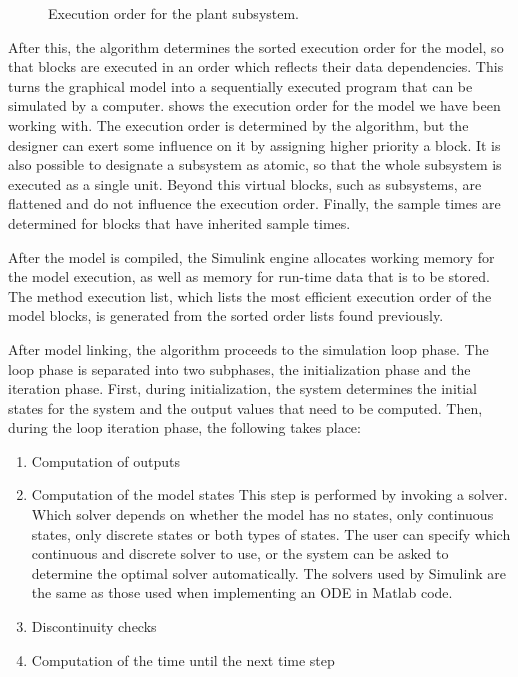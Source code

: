 \documentclass[\rootfolder/main.tex]{subfiles}
\begin{document}
\begin{figure}[ht]
    \caption{Execution order for the plant subsystem.\label{fig:simulink-inertial-order}}
\end{figure}

After this, the algorithm determines the sorted execution order for the model, so that blocks are executed in an order which reflects their data dependencies.
This turns the graphical model into a sequentially executed program that can be simulated by a computer.
 shows the execution order for the model we have been working with.
The execution order is determined by the algorithm, but the designer can exert some influence on it by assigning higher priority a block.
It is also possible to designate a subsystem as atomic, so that the whole subsystem is executed as a single unit.
Beyond this virtual blocks, such as subsystems, are flattened and do not influence the execution order.
Finally, the sample times are determined for blocks that have inherited sample times.

After the model is compiled, the Simulink engine allocates working memory for the model execution, as well as memory for run-time data that is to be stored.
The method execution list, which lists the most efficient execution order of the model blocks, is generated from the sorted order lists found previously.

After model linking, the algorithm proceeds to the simulation loop phase.
The loop phase is separated into two subphases, the initialization phase and the iteration phase.
First, during initialization, the system determines the initial states for the system and the output values that need to be computed.
Then, during the loop iteration phase, the following takes place:

\begin{enumerate}
    \item Computation of outputs
    \item Computation of the model states
        This step is performed by invoking a solver.
        Which solver depends on whether the model has no states, only continuous states, only discrete states or both types of states.
        The user can specify which continuous and discrete solver to use, or the system can be asked to determine the optimal solver automatically.
        The solvers used by Simulink are the same as those used when implementing an ODE in Matlab code.
    \item Discontinuity checks
    \item Computation of the time until the next time step
\end{enumerate}
\end{document}

